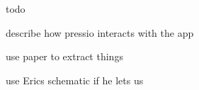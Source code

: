todo
\begin{DoxyItemize}
\item describe how pressio interacts with the app
\item use paper to extract things
\item use Eric\textquotesingle{}s schematic if he lets us 
\end{DoxyItemize}